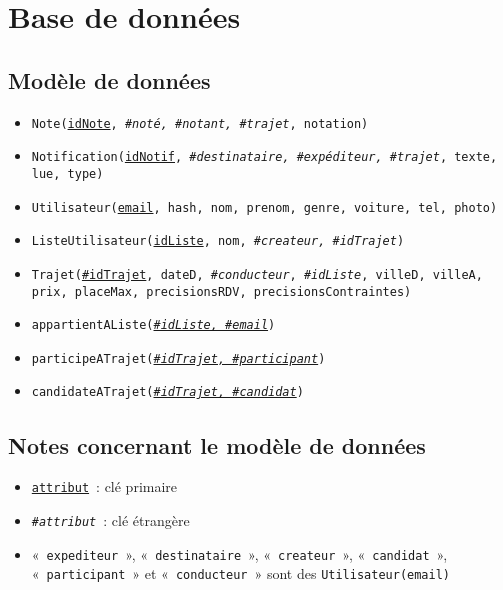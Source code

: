 \chapter{Base de données}

\section*{Modèle de données}

\begin{itemize}

\item \texttt{Note(\underline{idNote}, \textit{\#noté, \#notant, \#trajet}, notation)}

\item \texttt{Notification(\underline{idNotif}, \textit{\#destinataire, \#expéditeur, \#trajet}, texte, lue, type)}

\item \texttt{Utilisateur(\underline{email}, hash, nom, prenom, genre, voiture, tel, photo)}

\item \texttt{ListeUtilisateur(\underline{idListe}, nom, \textit{\#createur, \#idTrajet})}

\item \texttt{Trajet(\underline{\#idTrajet}, dateD, \textit{\#conducteur}, \textit{\#idListe}, villeD, villeA, prix, placeMax, precisionsRDV, precisionsContraintes)}

\item \texttt{appartientAListe(\underline{\textit{\#idListe, \#email}})}

\item \texttt{participeATrajet(\underline{\textit{\#idTrajet, \#participant}})}

\item \texttt{candidateATrajet(\underline{\textit{\#idTrajet, \#candidat}})}

\end{itemize}

\section*{Notes concernant le modèle de données}

\begin{itemize}

\item \texttt{\underline{attribut}}~: clé primaire

\item \texttt{\textit{\#attribut}}~: clé étrangère

\item «~\texttt{expediteur}~», «~\texttt{destinataire}~», «~\texttt{createur}~», «~\texttt{candidat}~», «~\texttt{participant}~» et «~\texttt{conducteur}~» sont des \texttt{Utilisateur(email)}


\end{itemize}